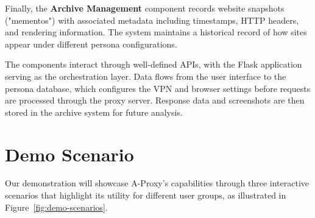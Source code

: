 \documentclass[sigconf]{acmart}
\begin{document}
Finally, the \textbf{Archive Management} component records website snapshots ("mementos") with associated metadata including timestamps, HTTP headers, and rendering information. The system maintains a historical record of how sites appear under different persona configurations.

The components interact through well-defined APIs, with the Flask application serving as the orchestration layer. Data flows from the user interface to the persona database, which configures the VPN and browser settings before requests are processed through the proxy server. Response data and screenshots are then stored in the archive system for future analysis.

\section{Demo Scenario}
Our demonstration will showcase A-Proxy's capabilities through three interactive scenarios that highlight its utility for different user groups, as illustrated in Figure~\ref{fig:demo-scenarios}.
\end{document}
